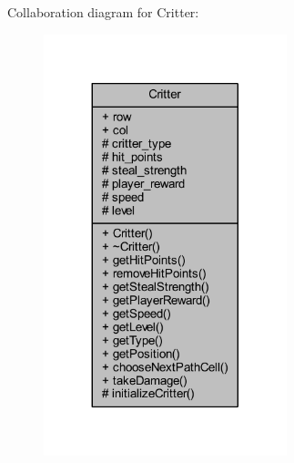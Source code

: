 Collaboration diagram for Critter\+:
\nopagebreak
\begin{figure}[H]
\begin{center}
\leavevmode
\includegraphics[width=200pt]{class_critter__coll__graph}
\end{center}
\end{figure}

